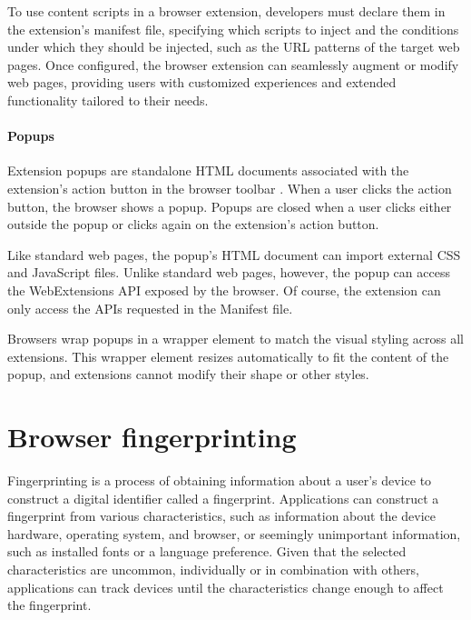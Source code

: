 To use content scripts in a browser extension, developers must declare them in the extension's manifest file, specifying which scripts to inject and the conditions under which they should be injected, such as the URL patterns of the target web pages. Once configured, the browser extension can seamlessly augment or modify web pages, providing users with customized experiences and extended functionality tailored to their needs.

\subsubsection{Popups}

Extension popups are standalone HTML documents associated with the extension's action button in the browser toolbar \cite{ChromeWebExtensions}. When a user clicks the action button, the browser shows a popup. Popups are closed when a user clicks either outside the popup or clicks again on the extension's action button.

Like standard web pages, the popup's HTML document can import external CSS and JavaScript files. Unlike standard web pages, however, the popup can access the WebExtensions API exposed by the browser. Of course, the extension can only access the APIs requested in the Manifest file.

Browsers wrap popups in a wrapper element to match the visual styling across all extensions. This wrapper element resizes automatically to fit the content of the popup, and extensions cannot modify their shape or other styles.




\chapter{Browser fingerprinting}
\label{Chapter:BrowserFingerprinting}

Fingerprinting is a process of obtaining information about a user's device to construct a digital identifier called a fingerprint. Applications can construct a fingerprint from various characteristics, such as information about the device hardware, operating system, and browser, or seemingly unimportant information, such as installed fonts or a language preference. Given that the selected characteristics are uncommon, individually or in combination with others, applications can track devices until the characteristics change enough to affect the fingerprint.


